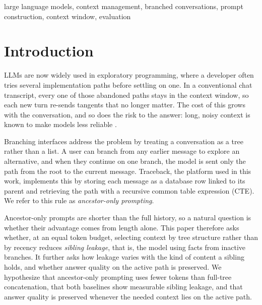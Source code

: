 \documentclass[conference]{IEEEtran}
\theoremstyle{definition}
\begin{document}
\begin{IEEEkeywords}
large language models, context management, branched conversations, prompt construction, context window, evaluation
\end{IEEEkeywords}

\section{Introduction}

LLMs are now widely used in exploratory programming, where a developer often tries several implementation paths before settling on one. In a conventional chat transcript, every one of those abandoned paths stays in the context window, so each new turn re-sends tangents that no longer matter. The cost of this grows with the conversation, and so does the risk to the answer: long, noisy context is known to make models less reliable \cite{hong2025contextrot,liu2024lost}.

Branching interfaces address the problem by treating a conversation as a tree rather than a list. A user can branch from any earlier message to explore an alternative, and when they continue on one branch, the model is sent only the path from the root to the current message. Traceback, the platform used in this work, implements this by storing each message as a database row linked to its parent and retrieving the path with a recursive common table expression (CTE). We refer to this rule as \emph{ancestor-only prompting}.

Ancestor-only prompts are shorter than the full history, so a natural question is whether their advantage comes from length alone. This paper therefore asks whether, at an equal token budget, selecting context by tree structure rather than by recency reduces \emph{sibling leakage}, that is, the model using facts from inactive branches. It further asks how leakage varies with the kind of content a sibling holds, and whether answer quality on the active path is preserved. We hypothesize that ancestor-only prompting uses fewer tokens than full-tree concatenation, that both baselines show measurable sibling leakage, and that answer quality is preserved whenever the needed context lies on the active path.
\end{document}
